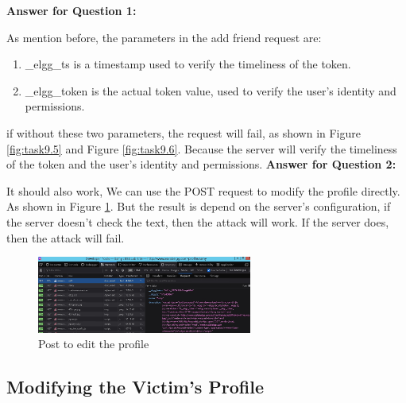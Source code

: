 \documentclass[a4paper,11pt]{article}
\begin{document}
\textbf{Answer for Question 1:} 

As mention before, the parameters in the add friend request are:
\begin{enumerate}
    \item \_elgg\_ts is a timestamp used to verify the timeliness of the token.
    \item \_elgg\_token is the actual token value, used to verify the user's identity and permissions.
\end{enumerate}
if without these two parameters, the request will fail, as shown in Figure \ref{fig:task9.5} and Figure \ref{fig:task9.6}. Because the server will verify the timeliness of the token and the user's identity and permissions.
\textbf{Answer for Question 2:} 

It should also work, We can use the POST request to modify the profile directly. As shown in Figure \ref{fig:task9.7}. But the result is depend on the server's configuration, if the server doesn't check the text, then the attack will work. If the server does, then the attack will fail.

\begin{figure}[h]
    \centering
       \includegraphics[width=0.63\textwidth]{figures/task9/task9.7.png}
    \caption{Post to edit the profile}\label{fig:task9.7}
\end{figure}

\subsection{Modifying the Victim’s Profile}
\end{document}
